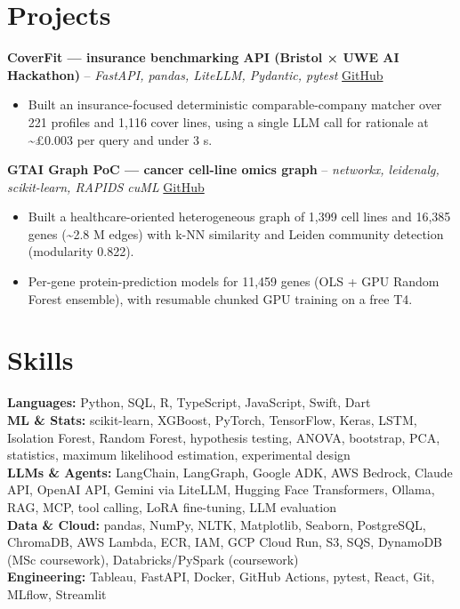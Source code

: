 \documentclass[a4paper,10pt]{article}
\begin{document}
\section{Projects}
\noindent\textbf{CoverFit — insurance benchmarking API (Bristol × UWE AI Hackathon)} -- \textit{FastAPI, pandas, LiteLLM, Pydantic, pytest} \hfill \href{https://github.com/Thiruvel-AP/AIHackathon-Phoenix}{GitHub}
\begin{itemize}
  \item Built an insurance-focused deterministic comparable-company matcher over 221 profiles and 1,116 cover lines, using a single LLM call for rationale at \textasciitilde{}£0.003 per query and under 3 s.
\end{itemize}
\noindent\textbf{GTAI Graph PoC — cancer cell-line omics graph} -- \textit{networkx, leidenalg, scikit-learn, RAPIDS cuML} \hfill \href{https://github.com/Thiruvel-AP/GTAI-GraphPOC}{GitHub}
\begin{itemize}
  \item Built a healthcare-oriented heterogeneous graph of 1,399 cell lines and 16,385 genes (\textasciitilde{}2.8 M edges) with k-NN similarity and Leiden community detection (modularity 0.822).
  \item Per-gene protein-prediction models for 11,459 genes (OLS + GPU Random Forest ensemble), with resumable chunked GPU training on a free T4.
\end{itemize}

\section{Skills}
\textbf{Languages:} Python, SQL, R, TypeScript, JavaScript, Swift, Dart\\
\textbf{ML \& Stats:} scikit-learn, XGBoost, PyTorch, TensorFlow, Keras, LSTM, Isolation Forest, Random Forest, hypothesis testing, ANOVA, bootstrap, PCA, statistics, maximum likelihood estimation, experimental design\\
\textbf{LLMs \& Agents:} LangChain, LangGraph, Google ADK, AWS Bedrock, Claude API, OpenAI API, Gemini via LiteLLM, Hugging Face Transformers, Ollama, RAG, MCP, tool calling, LoRA fine-tuning, LLM evaluation\\
\textbf{Data \& Cloud:} pandas, NumPy, NLTK, Matplotlib, Seaborn, PostgreSQL, ChromaDB, AWS Lambda, ECR, IAM, GCP Cloud Run, S3, SQS, DynamoDB (MSc coursework), Databricks/PySpark (coursework)\\
\textbf{Engineering:} Tableau, FastAPI, Docker, GitHub Actions, pytest, React, Git, MLflow, Streamlit
\end{document}
